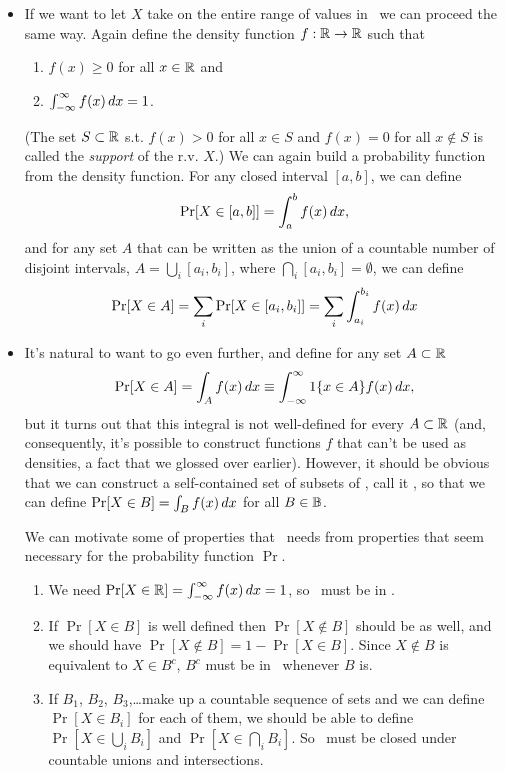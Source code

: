 \begin{itemize}
\item If we want to let $X$ take on the entire range of values in \RR\
  we can proceed the same way.  Again define the density function $f:
  \mathbb{R} \to \mathbb{R}$ such that
  \begin{enumerate}
  \item $f(x) \geq 0$ for all $x \in \mathbb{R}$ and
  \item $\int_{-\infty}^\infty f(x) \,dx = 1$.
  \end{enumerate}
  (The set $S \subset \mathbb{R}$ s.t. $f(x) > 0$ for all $x \in S$ and $f(x) = 0$
  for all $x \notin S$ is called the \emph{support} of the r.v. $X$.)  We
  can again build a probability function from the density function.
  For any closed interval $[a, b]$,\sidenote{Remember, $[a,b] = \{x \in
  \RR \mid a \leq x \leq b\}$.} we can define
  \begin{equation*}
    \operatorname{Pr}[ X \in [a,b] ] = \int_a^b f(x) \,dx,
  \end{equation*}
  and for any set $A$ that can be written as the union of a countable
  number of disjoint intervals, $A = \bigcup_i [a_i, b_i]$, where
  $\bigcap_i [a_i, b_i] = \emptyset$, we can define
  \begin{equation*}
    \operatorname{Pr}[ X \in A ] = \sum_i \operatorname{Pr}[ X \in [a_i, b_i] ]
    = \sum_i \int_{a_i}^{b_i} f(x) \,dx
  \end{equation*}

\item It's natural to want to go even further, and define for any set
  $A \subset \mathbb{R}$
  \begin{equation*}
    \operatorname{Pr}[ X \in A ] = \int_A f(x) \,dx 
    \equiv \int_{-\infty}^\infty \operatorname{1}\{x \in A\} f(x) \,dx,
  \end{equation*}
  but it turns out that this integral is not well-defined for every $A
  \subset \mathbb{R}$ (and, consequently, it's possible to construct functions $f$
  that can't be used as densities, a fact that we glossed over
  earlier).  However, it should be obvious that we can construct a
  self-contained set of subsets of \RR, call it \BB, so that we can
  define $\operatorname{Pr}[X \in B] = \int_B f(x) \,dx$ for all $B \in \mathbb{B}$.

  We can motivate some of properties that \BB\ needs from properties
  that seem necessary for the probability function $\Pr$.

  \begin{enumerate}
  \item We need $\operatorname{Pr}[X \in \mathbb{R}] = \int_{-\infty}^\infty f(x) \,dx = 1$,
    so \RR\ must be in \BB.
  \item If $\Pr[X \in B]$ is well defined then $\Pr[X \notin B]$
    should be as well, and we should have $\Pr[X \notin B] = 1 - \Pr[X
    \in B]$.  Since $X \notin B$ is equivalent to $X \in B^c$, $B^c$
    must be in \BB\ whenever $B$ is.
  \item If $B_1$, $B_2$, $B_3$,\dots make up a countable sequence of
    sets and we can define $\Pr[X \in B_i]$ for each of them, we
    should be able to define $\Pr[X \in \bigcup_i B_i]$ and $\Pr[X \in
    \bigcap_i B_i]$.  So \BB\ must be closed under countable unions
    and intersections.
  \end{enumerate}


\end{itemize}
